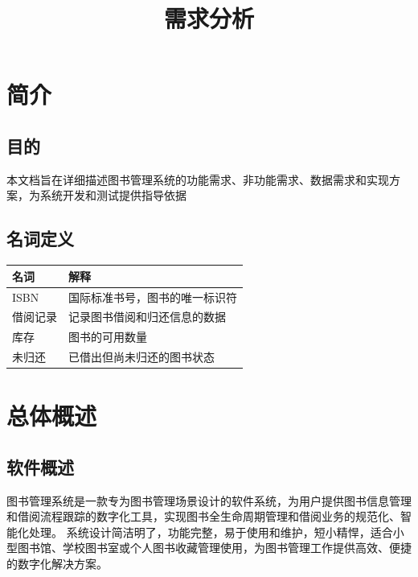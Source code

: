 \documentclass[UTF-8]{ctexart}
\begin{document}
\title{需求分析}
\author{}
\date{}
\maketitle
\newpage

\tableofcontents
\newpage

\section{简介}
\subsection{目的}
本文档旨在详细描述图书管理系统的功能需求、非功能需求、数据需求和实现方案，为系统开发和测试提供指导依据

\subsection{名词定义}

\begin{longtable}{ll}
\toprule
名词 & 解释 \\
\midrule
ISBN & 国际标准书号，图书的唯一标识符 \\
借阅记录 & 记录图书借阅和归还信息的数据 \\
库存 & 图书的可用数量 \\
未归还 & 已借出但尚未归还的图书状态 \\
\bottomrule
\end{longtable}

\section{总体概述}
\subsection{软件概述}
图书管理系统是一款专为图书管理场景设计的软件系统，为用户提供图书信息管理和借阅流程跟踪的数字化工具，实现图书全生命周期管理和借阅业务的规范化、智能化处理。
系统设计简洁明了，功能完整，易于使用和维护，短小精悍，适合小型图书馆、学校图书室或个人图书收藏管理使用，为图书管理工作提供高效、便捷的数字化解决方案。
\end{document}
